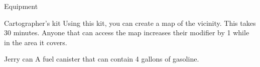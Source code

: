 \begin{abstractsection}{Equipment}
\begin{describe}{Cartographer's kit}
  Using this kit, you can create a map of the vicinity. This takes 30 minutes. Anyone that can access the map increases their  modifier by 1 while in the area it covers.
\end{describe}

\begin{describe}{Jerry can}
  A fuel canister that can contain 4 gallons of gasoline.
\end{describe}
\end{abstractsection}
